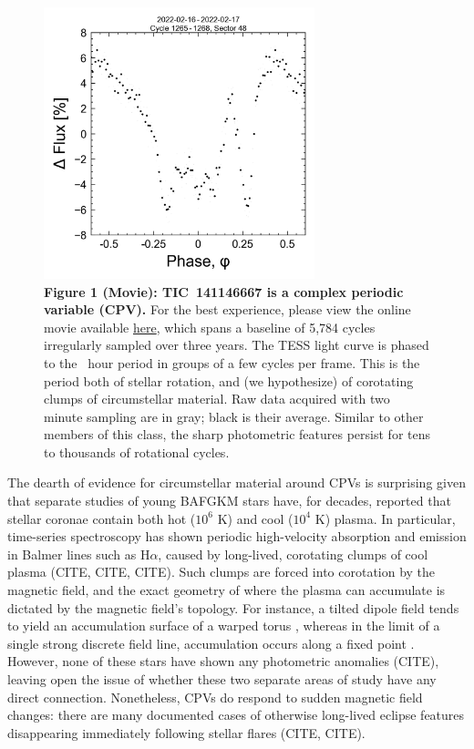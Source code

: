 \documentclass{nature3}
\begin{document}
\begin{figure}[!t]
  \centering
  \includegraphics[width=0.7\textwidth]{figures/f1.png}
  \caption[]{{\bf Figure 1 (Movie):  TIC~141146667 is a complex periodic
  variable (CPV).} For the best experience, please view the online movie
  available
  \href{https://lgbouma.com/movies/movie_TIC1411_flux_phase.mp4}{here},
  which spans a baseline of 5{,}784 cycles irregularly sampled over three
  years.  The TESS light curve is phased to the \periodhr\ hour period in
  groups of a few cycles per frame.  This is the period both of
  stellar rotation, and (we hypothesize) of corotating clumps of
  circumstellar material.  Raw data acquired with two minute
  sampling are in gray; black is their average.  Similar to other members
  of this class, the sharp photometric features persist for tens to
  thousands of rotational cycles. }
  \label{fig:lc}
\end{figure}



The dearth of evidence for circumstellar material around CPVs is
surprising given that separate studies of young BAFGKM stars have, for
decades, reported that stellar coronae contain both hot ($10^6$ K) and
cool ($10^4$ K) plasma. In particular, time-series spectroscopy has
shown periodic high-velocity absorption and emission in Balmer lines
such as H$\alpha$, caused by long-lived, corotating clumps of cool
plasma (CITE, CITE, CITE).  Such clumps are forced into corotation by
the magnetic field, and the exact geometry of where the plasma can
accumulate is dictated by the magnetic field's topology.
For instance, a tilted dipole field tends to yield an accumulation
surface of a warped torus \cite{Townsend2005}, whereas in the limit of
a single strong discrete field line, accumulation occurs along a fixed
point \cite{Waugh2022}.  However, none of these stars have shown any
photometric anomalies (CITE), leaving open the issue of whether these
two separate areas of study have any direct connection.  Nonetheless,
CPVs do respond to sudden magnetic field changes: there are many
documented cases of otherwise long-lived eclipse features disappearing
immediately following stellar flares (CITE, CITE).
\end{document}
